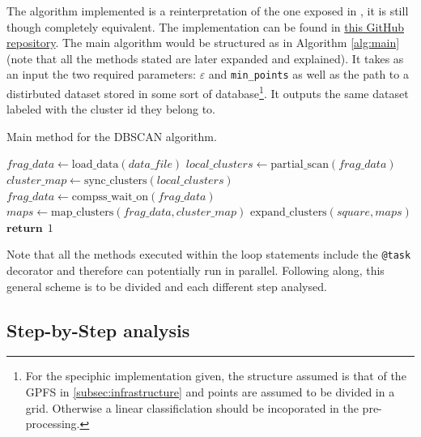 \documentclass[10pt,journal,compsoc]{IEEEtran}
\let\MYoriglatexcaption\caption
\renewcommand{\caption}[2][\relax]{\MYoriglatexcaption[#2]{#2}}
\begin{document}
The algorithm implemented is a reinterpretation of the one exposed in \cite{ReferencePaper}, it is still though completely equivalent. The implementation can be found in \href{https://github.com/csegarragonz/DBSCAN-pyCOMPSs}{this GitHub repository}. The main algorithm would be structured as in Algorithm \ref{alg:main} (note that all the methods stated are later expanded and explained). It takes as an input the two required parameters: $\varepsilon$ and \texttt{min\_points} as well as the path to a distirbuted dataset stored in some sort of database\footnote{For the speciphic implementation given, the structure assumed is that of the GPFS in \ref{subsec:infrastructure} and points are assumed to be divided in a grid. Otherwise a linear classificlation should be incoporated in the pre-processing.}. It outputs the same dataset labeled with the cluster id they belong to.

\begin{algorithm}
  \caption{Main method for the DBSCAN algorithm. \label{alg:main}}
  \begin{algorithmic}[1]
            \State $frag\_data \gets \text{load\_data}(data\_file)$
            \State $local\_clusters \gets \text{partial\_scan}(frag\_data)$
            \State $cluster\_map \gets \text{sync\_clusters}(local\_clusters)$
        \EndFor
        \State $frag\_data \gets \text{compss\_wait\_on}(frag\_data)$
        \State $ maps \gets \text{map\_clusters} (frag\_data, cluster\_map)$
            \State $\text{expand\_clusters} (square, maps)$
        \EndFor
        \State $\textbf{return} \hspace{5pt} 1$
    \EndFunction
  \end{algorithmic}
\end{algorithm}

Note that all the methods executed within the loop statements include the \texttt{@task} decorator and therefore can potentially run in parallel. Following along, this general scheme is to be divided and each different step analysed.

\subsection{Step-by-Step analysis} \label{step_by_step}
\end{document}
